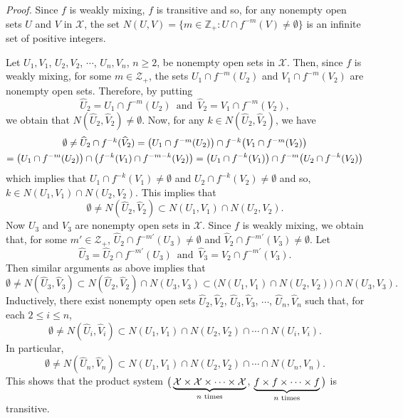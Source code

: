 \documentclass[12pt]{article}
\begin{document}
\noindent
{\it Proof.}
Since $f$ is weakly mixing, $f$ is transitive and so, for any nonempty open sets $U$ and $V$ in $\mathcal X$, the set $N(U, V) = \{ m \in \mathbb Z_+: U \cap f^{-m}(V) \ne \emptyset \}$ is an infinite set of positive integers.  

Let $U_1, V_1$, $U_2, V_2$, $\cdots$, $U_n, V_n$, $n \ge 2$, be nonempty open sets in $\mathcal X$.  Then, since $f$ is weakly mixing, for some $m \in \mathcal Z_+$, the sets $U_1 \cap f^{-m}(U_2)$ and $V_1 \cap f^{-m}(V_2)$ are nonempty open sets.  Therefore, by putting 
$$
\widehat U_2 = U_1 \cap f^{-m}(U_2) \,\,\, \text{and} \,\,\, \widehat V_2 = V_1 \cap f^{-m}(V_2),
$$ 
we obtain that $N(\widehat U_2, \widehat V_2) \ne \emptyset$.  Now, for any $k \in N(\widehat U_2, \widehat V_2)$, we have 
\begin{multline*}
$$
\emptyset \ne \widehat U_2 \cap f^{-k}(\widehat V_2) = \big(U_1 \cap f^{-m}(U_2)\big) \cap f^{-k}\big(V_1 \cap f^{-m}(V_2)\big) \\
= \big(U_1 \cap f^{-m}(U_2)\big) \cap \big(f^{-k}(V_1) \cap f^{-m-k}(V_2)\big) = \big(U_1 \cap f^{-k}(V_1)\big) \cap f^{-m}\big(U_2 \cap f^{-k}(V_2)\big)
$$
\end{multline*}
which implies that $U_1 \cap f^{-k}(V_1) \ne \emptyset$ and $U_2 \cap f^{-k}(V_2) \ne \emptyset$ and so, $k \in N(U_1, V_1) \cap N(U_2, V_2)$.  This implies that 
$$
\emptyset \ne N(\widehat U_2, \widehat V_2) \subset N(U_1, V_1) \cap N(U_2, V_2).
$$
\indent Now $U_3$ and $V_3$ are nonempty open sets in $\mathcal X$.  Since $f$ is weakly mixing, we obtain that, for some $m' \in \mathcal Z_+$, $\widehat U_2 \cap f^{-m'}(U_3) \ne \emptyset$ and $\widehat V_2 \cap f^{-m'}(V_3) \ne \emptyset$.  Let 
$$
\widehat U_3 = \widehat U_2 \cap f^{-m'}(U_3) \,\,\, \text{and} \,\,\, \widehat V_3 = \widehat V_2 \cap f^{-m'}(V_3).
$$
Then similar arguments as above implies that 
$$
\emptyset \ne N(\widehat U_3, \widehat V_3) \subset N(\widehat U_2, \widehat V_2) \cap N(U_3, V_3) \subset \big(N(U_1, V_1) \cap N(U_2, V_2)\big) \cap N(U_3, V_3).
$$
\indent Inductively, there exist nonempty open sets $\widehat U_2, \widehat V_2$, $\widehat U_3, \widehat V_3$, $\cdots$, $\widehat U_n, \widehat V_n$ such that, for each $2 \le i \le n$,  
$$
\emptyset \ne N(\widehat U_i, \widehat V_i) \subset N(U_1, V_1) \cap N(U_2, V_2) \cap \cdots \cap N(U_i, V_i).
$$
In particular, 
$$
\emptyset \ne N(\widehat U_n, \widehat V_n) \subset N(U_1, V_1) \cap N(U_2, V_2) \cap \cdots \cap N(U_n, V_n).
$$  
This shows that the product system $\big(\underbrace{\mathcal X \times \mathcal X \times \cdots \times \mathcal X}_{n \,\, \rm{times}}$, $\underbrace{f \times f \times \cdots \times f}_{n \,\, \rm{times}}\big)$ is transitive.
\end{document}
